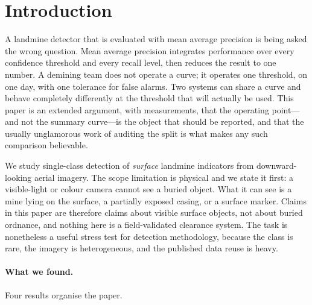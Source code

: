 \section{Introduction}
\label{sec:intro}

A landmine detector that is evaluated with mean average precision is being asked
the wrong question. Mean average precision integrates performance over every
confidence threshold and every recall level, then reduces the result to one
number. A demining team does not operate a curve; it operates one threshold, on
one day, with one tolerance for false alarms. Two systems can share a curve and
behave completely differently at the threshold that will actually be used. This
paper is an extended argument, with measurements, that the operating point---and
not the summary curve---is the object that should be reported, and that the
usually unglamorous work of auditing the split is what makes any such comparison
believable.

We study single-class detection of \emph{surface} landmine indicators from
downward-looking aerial imagery. The scope limitation is physical and we state it
first: a visible-light or colour camera cannot see a buried object. What it can
see is a mine lying on the surface, a partially exposed casing, or a surface
marker. Claims in this paper are therefore claims about visible surface objects,
not about buried ordnance, and nothing here is a field-validated clearance
system. The task is nonetheless a useful stress test for detection methodology,
because the class is rare, the imagery is heterogeneous, and the published data
reuse is heavy.

\paragraph{What we found.} Four results organise the paper.

